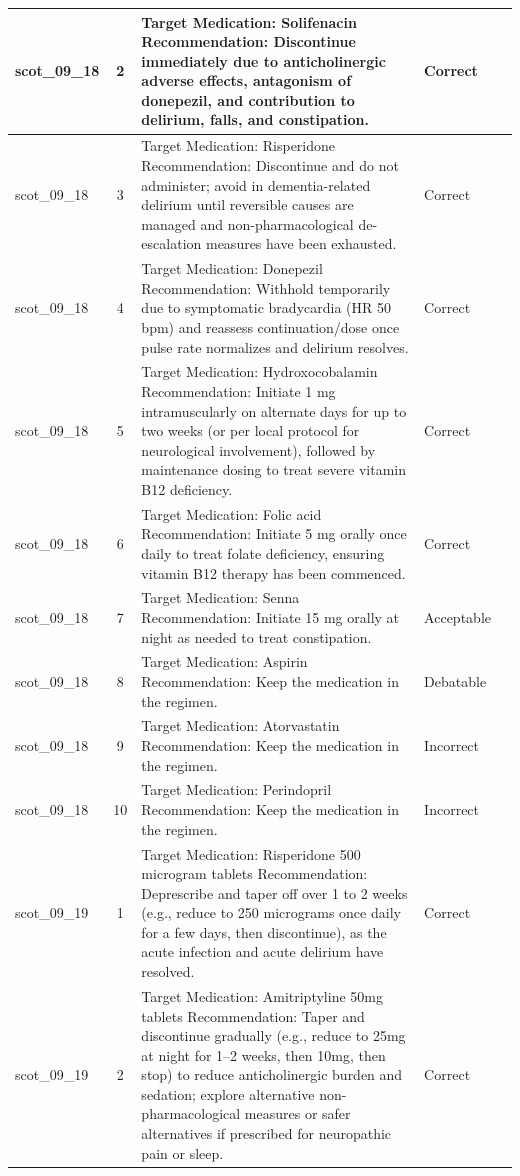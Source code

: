\begin{longtable}{|p{1.45cm}|c|p{10.2cm}|p{1.55cm}|p{2.3cm}|}
\hline
scot\_09\_18 & 2 & Target Medication: Solifenacin Recommendation: Discontinue immediately due to anticholinergic adverse effects, antagonism of donepezil, and contribution to delirium, falls, and constipation. & Correct &  \\
\hline
scot\_09\_18 & 3 & Target Medication: Risperidone Recommendation: Discontinue and do not administer; avoid in dementia-related delirium until reversible causes are managed and non-pharmacological de-escalation measures have been exhausted. & Correct &  \\
\hline
scot\_09\_18 & 4 & Target Medication: Donepezil Recommendation: Withhold temporarily due to symptomatic bradycardia (HR 50 bpm) and reassess continuation/dose once pulse rate normalizes and delirium resolves. & Correct &  \\
\hline
scot\_09\_18 & 5 & Target Medication: Hydroxocobalamin Recommendation: Initiate 1 mg intramuscularly on alternate days for up to two weeks (or per local protocol for neurological involvement), followed by maintenance dosing to treat severe vitamin B12 deficiency. & Correct &  \\
\hline
scot\_09\_18 & 6 & Target Medication: Folic acid Recommendation: Initiate 5 mg orally once daily to treat folate deficiency, ensuring vitamin B12 therapy has been commenced. & Correct &  \\
\hline
scot\_09\_18 & 7 & Target Medication: Senna Recommendation: Initiate 15 mg orally at night as needed to treat constipation. & Acceptable &  \\
\hline
scot\_09\_18 & 8 & Target Medication: Aspirin Recommendation: Keep the medication in the regimen. & Debatable &  \\
\hline
scot\_09\_18 & 9 & Target Medication: Atorvastatin Recommendation: Keep the medication in the regimen. & Incorrect &  \\
\hline
scot\_09\_18 & 10 & Target Medication: Perindopril Recommendation: Keep the medication in the regimen. & Incorrect &  \\
\hline
scot\_09\_19 & 1 & Target Medication: Risperidone 500 microgram tablets Recommendation: Deprescribe and taper off over 1 to 2 weeks (e.g., reduce to 250 micrograms once daily for a few days, then discontinue), as the acute infection and acute delirium have resolved. & Correct &  \\
\hline
scot\_09\_19 & 2 & Target Medication: Amitriptyline 50mg tablets Recommendation: Taper and discontinue gradually (e.g., reduce to 25mg at night for 1–2 weeks, then 10mg, then stop) to reduce anticholinergic burden and sedation; explore alternative non-pharmacological measures or safer alternatives if prescribed for neuropathic pain or sleep. & Correct &  \\

\end{longtable}
